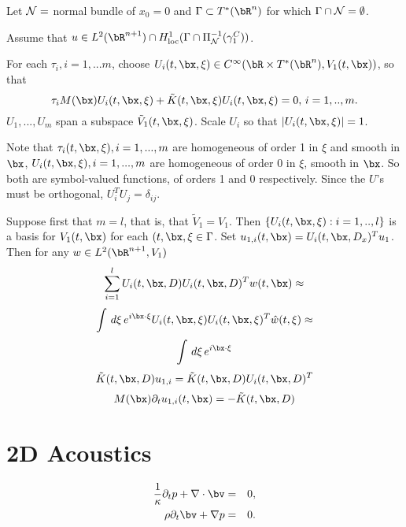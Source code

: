 Let ${\cal N} = $ normal bundle of $x_0=0$ and $\Gamma \subset T^*(\bR^n)$ for which $\Gamma \cap {\cal N} = \emptyset$.

Assume that $u \in L^2(\bR^{n+1}) \cap H^1_{\rm loc}(\Gamma \cap \Pi_{\cal N}^{-1}(\gamma_1^C))$.



For each $\tau_i, i =1,...m$, choose $U_i(t,\bx,\xi) \in C^{\infty}(\bR \times T^*(\bR^n),V_1(t,\bx))$,  so that
\[
  \tau_i M(\bx) U_i(t,\bx,\xi) + \tilde{K}(t,\bx,\xi) U_i(t,\bx,\xi)=0, \, i=1,..,m.
\]
$U_1,...,U_m$ span a subspace $\tilde{V}_1(t,\bx,\xi)$. Scale $U_i$ so that $|U_i(t,\bx,\xi)| = 1$.

Note that $\tau_i(t,\bx,\xi), i=1,...,m$ are homogeneous of order 1 in $\xi$ and smooth in $\bx$, $U_i(t,\bx,\xi), i=1,...,m$ are homogeneous of order 0 in $\xi$, smooth in $\bx$. So both are symbol-valued functions, of orders 1 and 0 respectively. Since the $U$'s must be orthogonal, $U_i^TU_j = \delta_{ij}$.

Suppose first that $m=l$, that is, that $\tilde{V}_1=V_1$. Then $\{U_i(t,\bx,\xi):i=1,..,l\}$ is a basis for $V_1(t,\bx)$ for each $(t,\bx,\xi \in \Gamma$. Set $u_{1,i}(t,\bx) = U_i(t,\bx,D_x)^Tu_1$. Then for any $w \in L^2(\bR^{n+1},V_1)$
\[
  \sum_{i=1}^l U_i(t,\bx,D)U_i(t,\bx,D)^Tw(t,\bx) \approx
\]
\[
  \int \, d\xi \, e^{i \bx \cdot \xi} U_i(t,\bx,\xi)U_i(t,\bx,\xi)^T\hat{w}(t,\xi) \approx
\]
\[
  \int \, d\xi \, e^{i \bx \cdot \xi}
\]
\[
  \tilde{K}(t,\bx,D)u_{1,i} = \tilde{K}(t,\bx,D)U_i(t,\bx,D)^T
\]
\[
  M(\bx)\partial_t u_{1,i}(t,\bx) = -\tilde{K}(t,\bx,D)
\]





\section{2D Acoustics}

\begin{eqnarray}
  \frac{1}{\kappa}\partial_t p + \nabla \cdot \bv & = & 0, \nonumber \\
  \rho \partial_t \bv + \nabla p & = & 0.
  \label{eqn:awe}                                     
\end{eqnarray}

